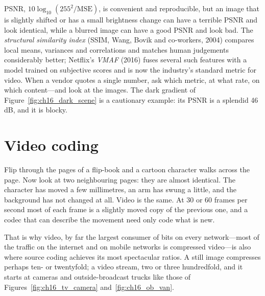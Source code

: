 
\begin{pitfall}
PSNR, $10\log_{10}(255^2/\text{MSE})$, is convenient and reproducible, but an image that is slightly
shifted or has a small brightness change can have a terrible PSNR and look identical, while a blurred
image can have a good PSNR and look bad. The \emph{structural similarity index} (SSIM, Wang, Bovik and
co-workers, 2004) compares local means, variances and correlations and matches human judgements
considerably better; Netflix's \emph{VMAF} (2016) fuses several such features with a model trained on
subjective scores and is now the industry's standard metric for video. When a vendor quotes a single
number, ask which metric, at what rate, on which content---and look at the images. The dark gradient of
Figure~\ref{fig:ch16_dark_scene} is a cautionary example: its PSNR is a splendid 46\,dB, and it is
blocky.
\end{pitfall}

\section{Video coding}
\label{sec:ch16:video}

Flip through the pages of a flip-book and a cartoon character walks across the page. Now look at
two neighbouring pages: they are almost identical. The character has moved a few millimetres, an
arm has swung a little, and the background has not changed at all. Video is the same. At 30 or 60
frames per second most of each frame is a slightly moved copy of the previous one, and a codec that
can describe the movement need only code what is new.

That is why video, by far the largest consumer of bits on every network---most of the traffic on the
internet and on mobile networks is compressed video---is also where source coding achieves its most
spectacular ratios. A still image compresses perhaps ten- or twentyfold; a video stream, two or three
hundredfold, and it starts at cameras and outside-broadcast trucks like those of Figures~\ref{fig:ch16_tv_camera} and~\ref{fig:ch16_ob_van}.


